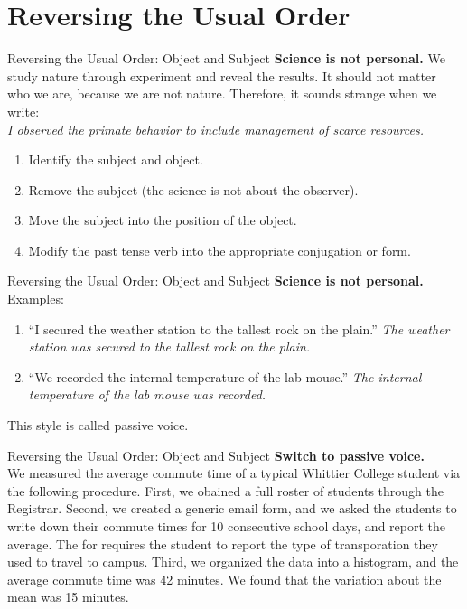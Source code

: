 \documentclass{beamer}
\begin{document}
\section{Reversing the Usual Order}

\begin{frame}{Reversing the Usual Order: Object and Subject}
\textbf{Science is not personal.}  We study nature through experiment and reveal the results.  It should not matter who we are, because we are not nature. Therefore, it sounds strange when we write: \\ \vspace{0.25cm}
\textit{I observed the primate behavior to include management of scarce resources.}
\begin{enumerate}
\item Identify the subject and object.
\item Remove the subject (the science is not about the observer).
\item Move the subject into the position of the object.
\item Modify the past tense verb into the appropriate conjugation or form.
\end{enumerate}
\end{frame}

\begin{frame}{Reversing the Usual Order: Object and Subject}
\textbf{Science is not personal.} Examples:
\begin{enumerate}
\item ``I secured the weather station to the tallest rock on the plain.'' \textit{The weather station was secured to the tallest rock on the plain.}
\item ``We recorded the internal temperature of the lab mouse.'' \textit{The internal temperature of the lab mouse was recorded.}
\end{enumerate}
This style is called \alert{passive voice}.
\end{frame}

\begin{frame}{Reversing the Usual Order: Object and Subject}
\small
\textbf{Switch to passive voice.} \\
We measured the average commute time of a typical Whittier College student via the following procedure. First, we obained a full roster of students through the Registrar.  Second, we created a generic email form, and we asked the students to write down their commute times for 10 consecutive school days, and report the average.  The for requires the student to report the type of transporation they used to travel to campus.  Third, we organized the data into a histogram, and the average commute time was 42
minutes.  We found that the variation about the mean was 15 minutes.
\end{frame}
\end{document}
